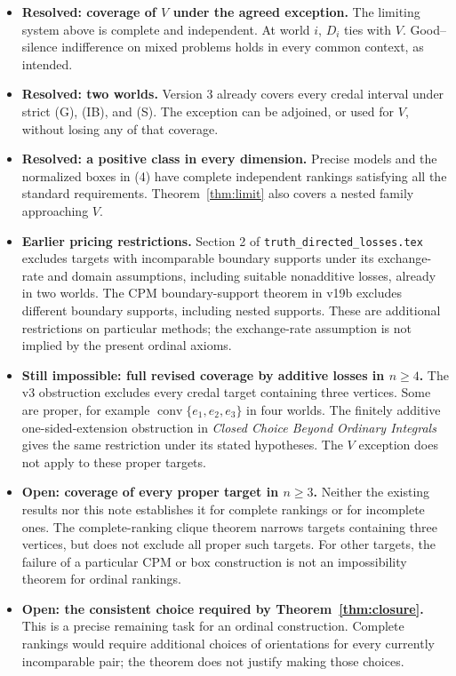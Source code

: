 \documentclass[11pt]{article}
\theoremstyle{remark}\newtheorem{remark}[theorem]{Remark}
\begin{document}
\begin{itemize}[leftmargin=*,itemsep=5pt]
\item \textbf{Resolved: coverage of $V$ under the agreed exception.}
The limiting system above is complete and independent. At world $i$,
$D_i$ ties with $V$. Good--silence indifference on mixed problems holds
in every common context, as intended.
\item \textbf{Resolved: two worlds.} Version 3 already covers every
credal interval under strict (G), (IB), and (S). The exception can be
adjoined, or used for $V$, without losing any of that coverage.
\item \textbf{Resolved: a positive class in every dimension.}
Precise models and the normalized boxes in (4) have complete independent
rankings satisfying all the standard requirements. Theorem~\ref{thm:limit}
also covers a nested family approaching $V$.
\item \textbf{Earlier pricing restrictions.} Section 2 of
\texttt{truth\_directed\_losses.tex} excludes targets with incomparable
boundary supports under its exchange-rate and domain assumptions,
including suitable nonadditive losses, already in two worlds. The CPM
boundary-support theorem in v19b excludes different boundary supports,
including nested supports. These are additional restrictions on particular
methods; the exchange-rate assumption is not implied by the present
ordinal axioms.
\item \textbf{Still impossible: full revised coverage by additive losses
in $n\ge4$.} The v3 obstruction excludes every credal target containing
three vertices. Some are proper, for example
$\operatorname{conv}\{e_1,e_2,e_3\}$ in four worlds. The finitely additive
one-sided-extension obstruction in \emph{Closed Choice Beyond Ordinary
Integrals} gives the same restriction under its stated hypotheses.
The $V$ exception does not apply to these proper targets.
\item \textbf{Open: coverage of every proper target in $n\ge3$.}
Neither the existing results nor this note establishes it for complete
rankings or for incomplete ones. The complete-ranking clique theorem
narrows targets containing three vertices, but does not exclude all
proper such targets. For other targets, the failure of a particular
CPM or box construction is not an impossibility theorem for ordinal
rankings.
\item \textbf{Open: the consistent choice required by
Theorem~\ref{thm:closure}.} This is a precise remaining task for an
ordinal construction. Complete rankings would require additional choices
of orientations for every currently incomparable pair; the theorem does
not justify making those choices.
\end{itemize}
\end{document}
